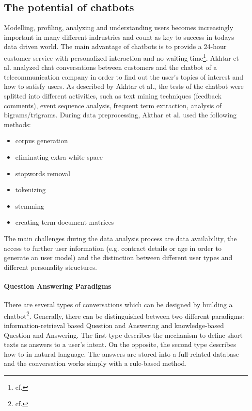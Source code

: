 \subsection{The potential of chatbots}
Modelling, profiling, analyzing and understanding users becomes increasingly important in many different indrustries and count as key to success in todays data driven world. 
The main advantage of chatbots is to provide a 24-hour customer service with personalized interaction and no waiting time\footnote{cf.\autocite{akhtar}}.
Akhtar et al. analyzed chat conversations between customers and the chatbot of a telecommunication company in order to find out the user's topics of interest and how to satisfy users. As described by Akhtar et al., the tests of the chatbot were splitted into different activities, such as text mining techniques (feedback comments), event sequence analysis, frequent term extraction, analysis of bigrams/trigrams. 
During data preprocessing, Akthar et al. used the following methods:
\begin{itemize}
\setlength\itemsep{-0.5em}
  \item[1.] corpus generation
  \item[2.] eliminating extra white space
  \item[3.] stopwords removal
  \item[4.] tokenizing
  \item[5.] stemming
  \item[6.] creating term-document matrices
\end{itemize}

The main challenges during the data analysis process are data availability, the access to further user information (e.g. contract details or age in order to generate an user model) and the distinction between different user types and different personality structures.

\paragraph{Question Answering Paradigms}
There are several types of conversations which can be designed by building a chatbot\footnote{cf.\autocite{akhtar}}. Generally, there can be distinguished between two different paradigms: information-retrieval based Question and Answering and knowledge-based Question and Answering. The first type describes the mechanism to define short texts as answers to a user's intent. On the opposite, the second type describes how to in natural language. The answers are stored into a full-related database and the conversation works simply with a rule-based method.
